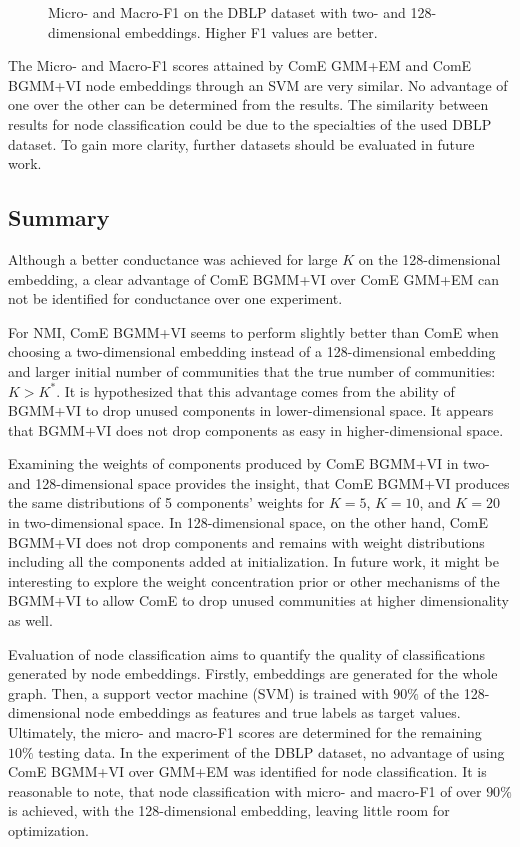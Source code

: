 \documentclass[conference]{IEEEtran}
\begin{document}
\begin{figure}[H]
    \caption{Micro- and Macro-F1 on the DBLP dataset with two- and 128-dimensional embeddings. Higher F1 values are better.}
    \label{table:dblp_f1}
\end{figure}

The Micro- and Macro-F1 scores attained by ComE GMM+EM and ComE BGMM+VI node embeddings through an SVM are very similar. No advantage of one over the other can be determined from the results. The similarity between results for node classification could be due to the specialties of the used DBLP dataset. To gain more clarity, further datasets should be evaluated in future work.


\subsection{Summary}

Although a better conductance was achieved for large $K$ on the 128-dimensional embedding, a clear advantage of ComE BGMM+VI over ComE GMM+EM can not be identified for conductance over one experiment.

For NMI, ComE BGMM+VI seems to perform slightly better than ComE when choosing a two-dimensional embedding instead of a 128-dimensional embedding and larger initial number of communities that the true number of communities: $K>K^*$. It is hypothesized that this advantage comes from the ability of BGMM+VI to drop unused components in lower-dimensional space. It appears that BGMM+VI does not drop components as easy in higher-dimensional space.

Examining the weights of components produced by ComE BGMM+VI in two- and 128-dimensional space provides the insight, that ComE BGMM+VI produces the same distributions of 5 components' weights for $K=5$, $K=10$, and $K=20$ in two-dimensional space. In 128-dimensional space, on the other hand, ComE BGMM+VI does not drop components and remains with weight distributions including all the components added at initialization. In future work, it might be interesting to explore the weight concentration prior or other mechanisms of the BGMM+VI to allow ComE to drop unused communities at higher dimensionality as well.

Evaluation of node classification aims to quantify the quality of classifications generated by node embeddings. Firstly, embeddings are generated for the whole graph. Then, a support vector machine (SVM) is trained with $90\%$ of the 128-dimensional node embeddings as features and true labels as target values. Ultimately, the micro- and macro-F1 scores are determined for the remaining $10\%$ testing data. In the experiment of the DBLP dataset, no advantage of using ComE BGMM+VI over GMM+EM was identified for node classification. It is reasonable to note, that node classification with micro- and macro-F1 of over $90\%$ is achieved, with the 128-dimensional embedding, leaving little room for optimization.
\end{document}
